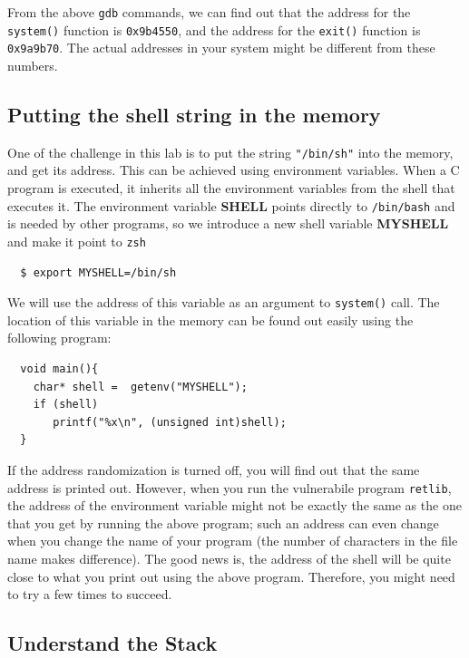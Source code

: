 From the above {\tt gdb} commands, we can find out that the address 
for the {\tt system()} function is {\tt 0x9b4550}, and the address
for the {\tt exit()} function is {\tt 0x9a9b70}. The actual addresses
in your system might be different from these numbers.


\subsection{Putting the shell string in the memory}

One of the challenge in this lab is to put the string {\tt "/bin/sh"}
into the memory, and get its address. This can be achieved using 
environment variables.
When a C program is executed, it inherits all the environment variables from
the shell that executes it. The environment variable \textbf{SHELL} points
directly to \texttt{/bin/bash} and is needed by other programs, so we introduce
a new shell variable \textbf{MYSHELL} and make it point to \texttt{zsh} \\

\begin{verbatim}
  $ export MYSHELL=/bin/sh
\end{verbatim}

We will use the address of this variable as an argument to {\tt system()} call.
The location of this variable in the memory can be found out easily using the 
following program: 
\begin{verbatim}
  void main(){
    char* shell =  getenv("MYSHELL");
    if (shell) 
       printf("%x\n", (unsigned int)shell);
  }
\end{verbatim}

If the address randomization is turned off, you will find out that the same 
address is printed out. However, when you run the 
vulnerabile program {\tt retlib}, the address of the environment
variable might not be exactly the same as the one that you get by running 
the above program; such an address can even change when you change
the name of your program (the number of characters in the file
name makes difference). The good news is, the address of the shell will
be quite close to what you print out using the above program. Therefore,
you might need to try a few times to succeed.


\subsection{Understand the Stack}

